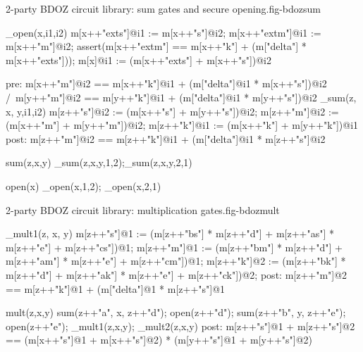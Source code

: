 \begin{fpfig}[t]{2-party BDOZ circuit library: sum gates and secure opening.}{fig-bdozsum}
{\footnotesize
\begin{verbatimtab}
  _open(x,i1,i2){
    m[x++"exts"]@i1 := m[x++"s"]@i2;
    m[x++"extm"]@i1 := m[x++"m"]@i2;
    assert(m[x++"extm"] == m[x++"k"] + (m["delta"] * m[x++"exts"]));
    m[x]@i1 := (m[x++"exts"] + m[x++"s"])@i2
  }
  
  pre: { m[x++"m"]@i2 == m[x++"k"]@i1 + (m["delta"]@i1 * m[x++"s"])@i2 /\
         m[y++"m"]@i2 == m[y++"k"]@i1 + (m["delta"]@i1 * m[y++"s"])@i2 }
  _sum(z, x, y,i1,i2) {
      m[z++"s"]@i2 := (m[x++"s"] + m[y++"s"])@i2;
      m[z++"m"]@i2 := (m[x++"m"] + m[y++"m"])@i2;
      m[z++"k"]@i1 := (m[x++"k"] + m[y++"k"])@i1
  }
  post: { m[z++"m"]@i2 == m[z++"k"]@i1 + (m["delta"]@i1 * m[z++"s"]@i2 } 
  
  sum(z,x,y) { _sum(z,x,y,1,2);_sum(z,x,y,2,1) }

  open(x) { _open(x,1,2); _open(x,2,1) }
\end{verbatimtab}
}
\end{fpfig}

\begin{fpfig}[t]{2-party BDOZ circuit library: multiplication gates.}{fig-bdozmult}
{\footnotesize
\begin{verbatimtab}
  _mult1(z, x, y) {
      m[z++"s"]@1 :=
        (m[z++"bs"] * m[z++"d"] + m[z++"as"] * m[z++"e"] + m[z++"cs"])@1;
      m[z++"m"]@1 :=
        (m[z++"bm"] * m[z++"d"] + m[z++"am"] * m[z++"e"] + m[z++"cm"])@1;
      m[z++"k"]@2 :=
        (m[z++"bk"] * m[z++"d"] + m[z++"ak"] * m[z++"e"] + m[z++"ck"])@2;    
  }
  post: { m[z++"m"]@2 == m[z++"k"]@1 + (m["delta"]@1 * m[z++"s"]@1 }

  mult(z,x,y) {
      sum(z++"a", x, z++"d");
      open(z++"d");
      sum(z++"b", y, z++"e");
      open(z++"e"); 
      _mult1(z,x,y); _mult2(z,x,y)
  }
  post: {  m[z++"s"]@1 + m[z++"s"]@2 ==
          (m[x++"s"]@1 + m[x++"s"]@2) * (m[y++"s"]@1 + m[y++"s"]@2)} 
  
\end{verbatimtab}
}
\end{fpfig}
